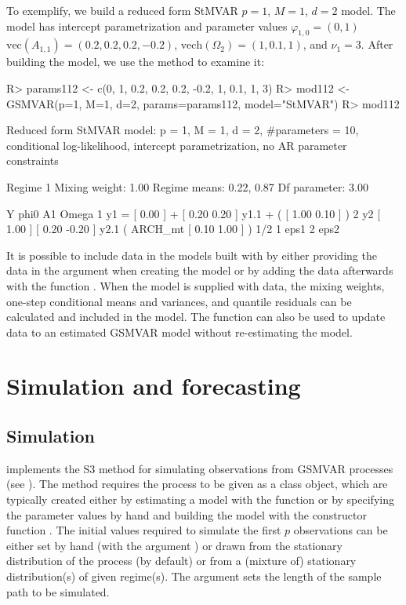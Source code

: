 \documentclass[nojss]{jss} %
\begin{document}
To exemplify, we build a reduced form StMVAR $p=1$, $M=1$, $d=2$ model. The model has intercept parametrization and parameter values $\varphi_{1,0}=(0, 1)$ $\text{vec}(A_{1,1}) = (0.2, 0.2, 0.2, -0.2)$, $\text{vech}(\Omega_2) = (1, 0.1, 1)$, and $\nu_1 = 3$. After building the model, we use the  method to examine it:
%
\begin{Schunk}
\begin{Sinput}
R> params112 <- c(0, 1, 0.2, 0.2, 0.2, -0.2, 1, 0.1, 1, 3)
R> mod112 <- GSMVAR(p=1, M=1, d=2, params=params112, model="StMVAR")
R> mod112
\end{Sinput}
\begin{Soutput}
Reduced form StMVAR model:
 p = 1, M = 1, d = 2, #parameters = 10, 
 conditional log-likelihood, intercept parametrization, no AR parameter constraints 

Regime 1
Mixing weight: 1.00 
Regime means: 0.22, 0.87
Df parameter:  3.00

   Y     phi0          A1                            Omega         
1 y1 = [ 0.00 ] + [  0.20  0.20 ] y1.1 + (         [  1.00 0.10 ] )
2 y2   [ 1.00 ]   [  0.20 -0.20 ] y2.1   ( ARCH_mt [  0.10 1.00 ] )
  1/2     
1     eps1
2     eps2
\end{Soutput}
\end{Schunk}
%

It is possible to include data in the models built with  by either providing the data in the argument  when creating the model or by adding the data afterwards with the function . When the model is supplied with data, the mixing weights, one-step conditional means and variances, and quantile residuals can be calculated and included in the model. The function  can also be used to update data to an estimated GSMVAR model without re-estimating the model.


\section{Simulation and forecasting}\label{sec:simufore}

\subsection{Simulation}\label{sec:simu}
 implements the S3 method  for simulating observations from GSMVAR processes (see ). The method requires the process to be given as a class  object, which are typically created either by estimating a model with the function  or by specifying the parameter values by hand and building the model with the constructor function . The initial values required to simulate the first $p$ observations can be either set by hand (with the argument ) or drawn from the stationary distribution of the process (by default) or from a (mixture of) stationary distribution(s) of given regime(s). The argument  sets the length of the sample path to be simulated.
\end{document}
